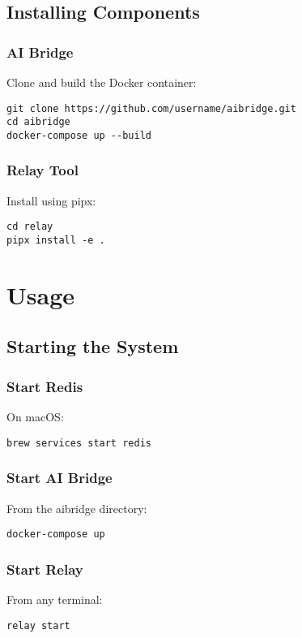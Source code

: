 \documentclass{article}
\begin{document}
\subsection{Installing Components}

\subsubsection{AI Bridge}
Clone and build the Docker container:
\begin{verbatim}
git clone https://github.com/username/aibridge.git
cd aibridge
docker-compose up --build
\end{verbatim}

\subsubsection{Relay Tool}
Install using pipx:
\begin{verbatim}
cd relay
pipx install -e .
\end{verbatim}

\section{Usage}

\subsection{Starting the System}

\subsubsection{Start Redis}
On macOS:
\begin{verbatim}
brew services start redis
\end{verbatim}

\subsubsection{Start AI Bridge}
From the aibridge directory:
\begin{verbatim}
docker-compose up
\end{verbatim}

\subsubsection{Start Relay}
From any terminal:
\begin{verbatim}
relay start
\end{verbatim}
\end{document}

